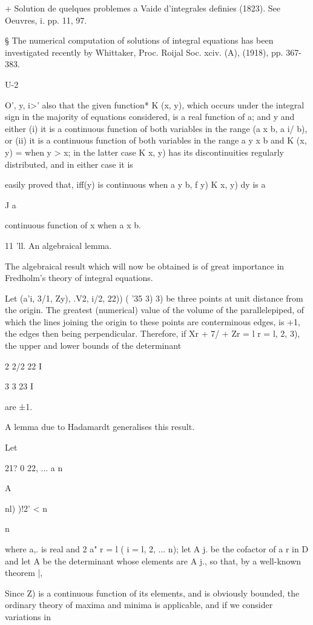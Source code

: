 + Solution de quelques problemes a Vaide d'integrales definies (1823).
See Oeuvres, i. pp. 11, 97.

§ The numerical computation of solutions of integral equations has
been investigated recently by Whittaker, Proc. Roijal Soc. xciv. (A),
(1918), pp. 367-383.

U-2

%
%

O', y, i>' also that the given function* K (x, y), which occurs under
the integral sign in the majority of equations considered, is a real
function of a; and y and either (i) it is a continuous function of
both variables in the range (a x b, a i/ b), or (ii) it is a
continuous function of both variables in the range a y x b and K (x,
y) = when y > x; in the latter case K x, y) has its discontinuities
regularly distributed, and in either case it is

easily proved that, iff(y) is continuous when a y b, f y) K x, y) dy
is a

J a

continuous function of x when a x b.

11 'll. An algebraical lemma.

The algebraical result which will now be obtained is of great
importance in Fredholm's theory of integral equations.

Let (a'i, 3/1, Zy), .V2, i/2, 22)) ( '35 3) 3) be three points at
unit distance from the origin. The greatest (numerical) value of the
volume of the parallelepiped, of which the lines joining the origin to
these points are conterminous edges, is +1, the edges then being
perpendicular. Therefore, if Xr + 7/ + Zr = l r = l, 2, 3), the upper
and lower bounds of the determinant

 2 2/2 22 I

 3 3 23 I

are ±1.

A lemma due to Hadamardt generalises this result.

Let

 21? 0 22, ... a n

A

 nl) )!2'  < n

n

where a,. is real and 2 a" r = l ( i = l, 2, ... n); let A j. be the
cofactor of a r in D and let A be the determinant whose elements are A
j., so that, by a well-known theorem |,

Since Z) is a continuous function of its elements, and is obviously
bounded, the ordinary theory of maxima and minima is applicable, and
if we consider variations in

